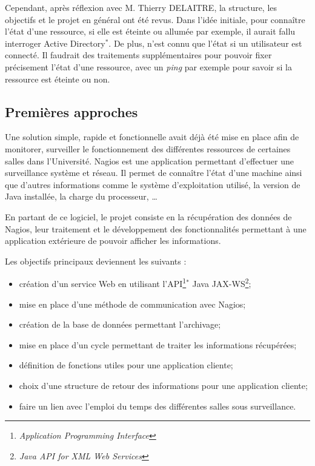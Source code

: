 Cependant, apr\`es r\'eflexion avec M. Thierry DELAITRE, la structure, les objectifs et le projet en g\'en\'eral ont \'et\'e revus.
Dans l'id\'ee initiale, pour conna\^itre l'\'etat d'une ressource, si elle est \'eteinte ou allum\'ee par exemple, il aurait fallu interroger Active Directory$^*$. 
De plus, n'est connu que l'\'etat si un utilisateur est connect\'e.
Il faudrait des traitements suppl\'ementaires pour pouvoir fixer pr\'ecisement l'\'etat d'une ressource, avec un \textit{ping} par exemple pour savoir si la ressource est \'eteinte ou non.

\subsection{Premi\`eres approches}

Une solution simple, rapide et fonctionnelle avait d\'ej\`a \'et\'e mise en place afin de \og{}monitorer\fg{}, \cad{} surveiller le fonctionnement des diff\'erentes ressources de certaines salles dans l'Universit\'e.
Nagios est une application permettant d'effectuer une surveillance syst\`eme et r\'eseau.
Il permet de conna\^itre l'\'etat d'une machine ainsi que d'autres informations comme le syst\`eme d'exploitation utilis\'e, la version de Java install\'ee, la charge du processeur, \ldots

En partant de ce logiciel, le projet consiste en la r\'ecup\'eration des donn\'ees de Nagios, leur traitement et le d\'eveloppement des fonctionnalit\'es permettant \`a une application ext\'erieure de pouvoir afficher les informations.

\noindent Les objectifs principaux deviennent les suivants :

\begin{itemize}
	\item cr\'eation d'un service Web en utilisant l'API\protect\footnote{\textit{Application Programming Interface}}$^*$ Java JAX-WS\protect\footnote{\textit{Java API for XML Web Services}};
	\item mise en place d'une m\'ethode de communication avec Nagios;
	\item cr\'eation de la base de donn\'ees permettant l'archivage;
	\item mise en place d'un cycle permettant de traiter les informations r\'ecup\'er\'ees;
	\item d\'efinition de fonctions utiles pour une application cliente;
	\item choix d'une structure de retour des informations pour une application cliente;
	\item faire un lien avec l'emploi du temps des diff\'erentes salles sous surveillance.

\end{itemize}

